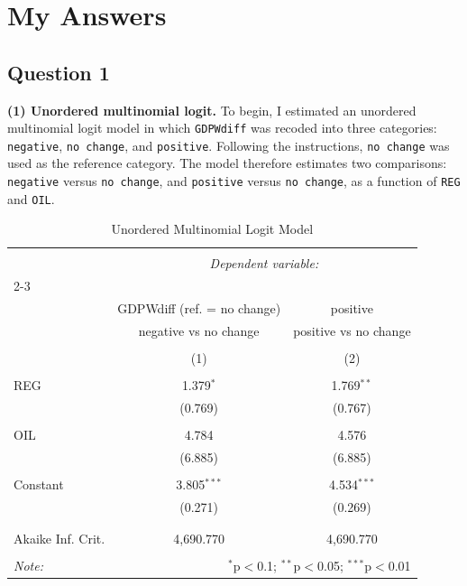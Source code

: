 \documentclass[12pt,letterpaper]{article}
\begin{document}
\section*{My Answers}
\subsection*{Question 1}

\noindent \textbf{(1) Unordered multinomial logit.}
To begin, I estimated an unordered multinomial logit model in which \texttt{GDPWdiff} was recoded into three categories: \texttt{negative}, \texttt{no change}, and \texttt{positive}. Following the instructions, \texttt{no change} was used as the reference category. The model therefore estimates two comparisons: \texttt{negative} versus \texttt{no change}, and \texttt{positive} versus \texttt{no change}, as a function of \texttt{REG} and \texttt{OIL}.\\

\begin{table}[!htbp] \centering 
	\caption{Unordered Multinomial Logit Model} 
	\label{} 
	\begin{tabular}{@{\extracolsep{5pt}}lcc} 
		\\[-1.8ex]\hline 
		\hline \\[-1.8ex] 
		& \multicolumn{2}{c}{\textit{Dependent variable:}} \\ 
		\cline{2-3} 
		\\[-1.8ex] & GDPWdiff (ref. = no change) & positive \\ 
		& negative vs no change & positive vs no change \\ 
		\\[-1.8ex] & (1) & (2)\\ 
		\hline \\[-1.8ex] 
		REG & 1.379$^{*}$ & 1.769$^{**}$ \\ 
		& (0.769) & (0.767) \\ 
		& & \\ 
		OIL & 4.784 & 4.576 \\ 
		& (6.885) & (6.885) \\ 
		& & \\ 
		Constant & 3.805$^{***}$ & 4.534$^{***}$ \\ 
		& (0.271) & (0.269) \\ 
		& & \\ 
		\hline \\[-1.8ex] 
		Akaike Inf. Crit. & 4,690.770 & 4,690.770 \\ 
		\hline 
		\hline \\[-1.8ex] 
		\textit{Note:}  & \multicolumn{2}{r}{$^{*}$p$<$0.1; $^{**}$p$<$0.05; $^{***}$p$<$0.01} \\ 
	\end{tabular} 
\end{table} 
\end{document}
